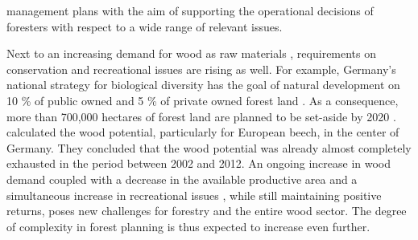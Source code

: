 management plans with the aim of supporting the operational decisions of foresters with respect to a wide range of relevant issues.

Next to an increasing demand for wood as raw materials \citep[p. 8]{mantau_2012}, requirements on conservation and recreational issues are rising as well. For example, Germany's national strategy for biological diversity has the goal of natural development on 10 \% of public owned and 5 \% of private owned forest land \citep[p. 45]{bmu_2007}. As a consequence, more than 700,000 hectares of forest land are planned to be set-aside by 2020 \citep{ti_2014}. \citet[p. 3]{auer_2016} calculated the wood potential, particularly for European beech, in the center of Germany. They concluded that the wood potential was already almost completely exhausted in the period between 2002 and 2012. An ongoing increase in wood demand coupled with a decrease in the available productive area and a simultaneous increase in recreational issues \citep[p. 1]{hansen_2012}, while still maintaining positive returns, poses new challenges for forestry and the entire wood sector. The degree of complexity in forest planning is thus expected to increase even further.

